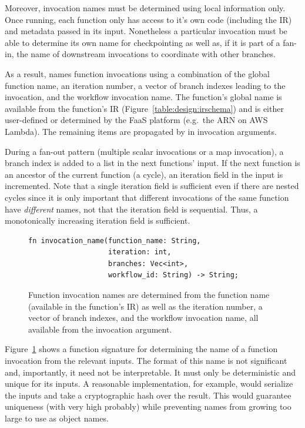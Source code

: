 Moreover, invocation names must be determined using local information only. Once
running, each function only has access to it's own code (including the IR) and
metadata passed in its input. Nonetheless a particular invocation must be able
to determine its own name for checkpointing as well as, if it is part of a
fan-in, the name of downstream invocations to coordinate with other branches.

As a result, \name{} names function invocations using a combination of the
global function name, an iteration number, a vector of branch indexes leading to
the invocation, and the workflow invocation name. The function's global name is
available from the function's IR (Figure~\ref{table:design:irschema}) and is
either user-defined or determined by the FaaS platform (e.g.\ the ARN on AWS
Lambda). The remaining items are propagated by \name{} in invocation arguments.

During a fan-out pattern (multiple scalar invocations or a map invocation), a
branch index is added to a list in the next functions' input. If the next
function is an ancestor of the current function (a cycle), an iteration field in
the input is incremented. Note that a single iteration field is sufficient even
if there are nested cycles since it is only important that different invocations
of the same function have \emph{different} names, not that the iteration field
is sequential. Thus, a monotonically increasing iteration field is sufficient.

\begin{figure}
\begin{verbatim}
fn invocation_name(function_name: String,
                   iteration: int,
                   branches: Vec<int>,
                   workflow_id: String) -> String;
\end{verbatim}
\caption{Function invocation names are determined from the function name
(available in the function's IR) as well as the iteration number, a vector of
branch indexes, and the workflow invocation name, all available from the
invocation argument.}
\label{fig:design:names}
\end{figure}

Figure~\ref{fig:design:names} shows a function signature for determining the name of a
function invocation from the relevant inputs. The format of this name is not
significant and, importantly, it need not be interpretable. It must only be
deterministic and unique for its inputs. A reasonable implementation, for
example, would serialize the inputs and take a cryptographic hash over the
result. This would guarantee uniqueness (with very high probably) while
preventing names from growing too large to use as object names.
